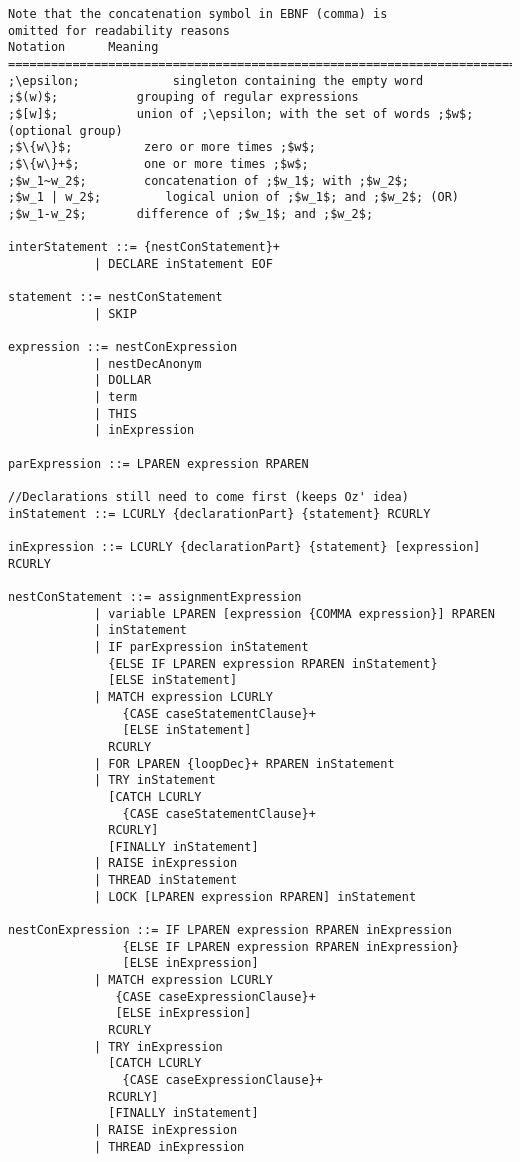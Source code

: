 \begin{lstlisting}[label={lst:newOzEBNF},language=ebnf]
Note that the concatenation symbol in EBNF (comma) is
omitted for readability reasons
Notation      Meaning
===========================================================================
;\epsilon;             singleton containing the empty word
;$(w)$;           grouping of regular expressions
;$[w]$;           union of ;\epsilon; with the set of words ;$w$; (optional group)
;$\{w\}$;          zero or more times ;$w$;
;$\{w\}+$;         one or more times ;$w$;
;$w_1~w_2$;        concatenation of ;$w_1$; with ;$w_2$;
;$w_1 | w_2$;         logical union of ;$w_1$; and ;$w_2$; (OR)
;$w_1-w_2$;       difference of ;$w_1$; and ;$w_2$;

interStatement ::= {nestConStatement}+
            | DECLARE inStatement EOF

statement ::= nestConStatement
            | SKIP

expression ::= nestConExpression
            | nestDecAnonym
            | DOLLAR
            | term
            | THIS
            | inExpression

parExpression ::= LPAREN expression RPAREN

//Declarations still need to come first (keeps Oz' idea)
inStatement ::= LCURLY {declarationPart} {statement} RCURLY

inExpression ::= LCURLY {declarationPart} {statement} [expression] RCURLY

nestConStatement ::= assignmentExpression
            | variable LPAREN [expression {COMMA expression}] RPAREN
            | inStatement
            | IF parExpression inStatement
              {ELSE IF LPAREN expression RPAREN inStatement}
              [ELSE inStatement]
            | MATCH expression LCURLY
                {CASE caseStatementClause}+
                [ELSE inStatement]
              RCURLY
            | FOR LPAREN {loopDec}+ RPAREN inStatement
            | TRY inStatement
              [CATCH LCURLY
                {CASE caseStatementClause}+
              RCURLY]
              [FINALLY inStatement]
            | RAISE inExpression
            | THREAD inStatement
            | LOCK [LPAREN expression RPAREN] inStatement

nestConExpression ::= IF LPAREN expression RPAREN inExpression
                {ELSE IF LPAREN expression RPAREN inExpression}
                [ELSE inExpression]
            | MATCH expression LCURLY
               {CASE caseExpressionClause}+
               [ELSE inExpression]
              RCURLY
            | TRY inExpression
              [CATCH LCURLY
                {CASE caseExpressionClause}+
              RCURLY]
              [FINALLY inStatement]
            | RAISE inExpression
            | THREAD inExpression


\end{lstlisting}
